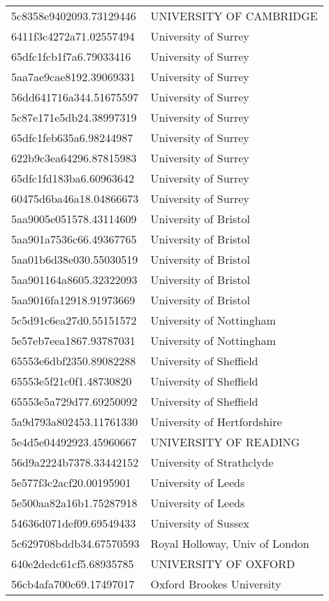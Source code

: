 \begin{tabular}{ll}
5c8358e9402093.73129446 & UNIVERSITY OF CAMBRIDGE \\
6411f3c4272a71.02557494 & University of Surrey \\
65dfc1fcb1f7a6.79033416 & University of Surrey \\
5aa7ae9cae8192.39069331 & University of Surrey \\
56dd641716a344.51675597 & University of Surrey \\
5c87e171e5db24.38997319 & University of Surrey \\
65dfc1feb635a6.98244987 & University of Surrey \\
622b9c3ea64296.87815983 & University of Surrey \\
65dfc1fd183ba6.60963642 & University of Surrey \\
60475d6ba46a18.04866673 & University of Surrey \\
5aa9005e051578.43114609 & University of Bristol \\
5aa901a7536c66.49367765 & University of Bristol \\
5aa01b6d38e030.55030519 & University of Bristol \\
5aa901164a8605.32322093 & University of Bristol \\
5aa9016fa12918.91973669 & University of Bristol \\
5c5d91c6ea27d0.55151572 & University of Nottingham \\
5e57eb7eea1867.93787031 & University of Nottingham \\
65553e6dbf2350.89082288 & University of Sheffield \\
65553e5f21c0f1.48730820 & University of Sheffield \\
65553e5a729d77.69250092 & University of Sheffield \\
5a9d793a802453.11761330 & University of Hertfordshire \\
5e4d5e04492923.45960667 & UNIVERSITY OF READING \\
56d9a2224b7378.33442152 & University of Strathclyde \\
5e577f3c2acf20.00195901 & University of Leeds \\
5e500aa82a16b1.75287918 & University of Leeds \\
54636d071def09.69549433 & University of Sussex \\
5c629708bddb34.67570593 & Royal Holloway, Univ of London \\
640e2dedc61cf5.68935785 & UNIVERSITY OF OXFORD \\
56cb4afa700c69.17497017 & Oxford Brookes University \\

\end{tabular}
